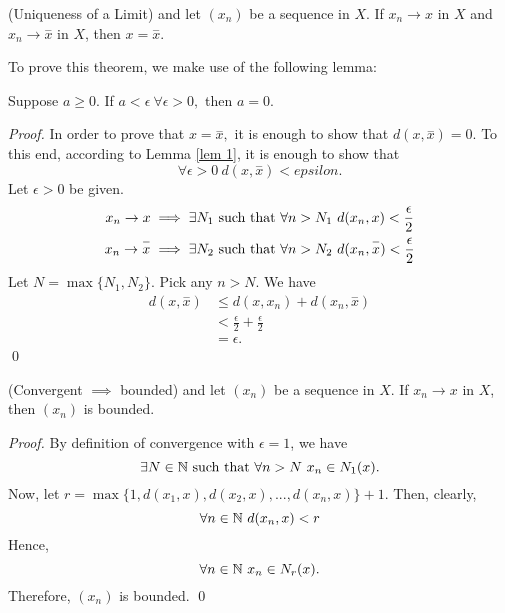 \documentclass[a4paper]{article}
\begin{document}
    \begin{theorem}(Uniqueness of a Limit)
        \routineMS and let $(x_n)$ be a sequence in $X$. If $x_n \to x$ in $X$ and $x_n \to \overset{-}{x}$ in $X$, then $x = \overset{-}{x}$.
    \end{theorem}
     To prove this theorem, we make use of the following lemma:
     \begin{lemma}
        \label{lem 1}
        Suppose $a \geq 0.$ If $a < \epsilon ~\forall \epsilon > 0,$ then $a=0$.
     \end{lemma}
     \begin{proof}
        In order to prove that $x = \overset{-}{x},$ it is enough to show that $d(x, \overset{-}{x}) = 0.$ To this end, according to Lemma \ref{lem 1}, it is enough to show that
        $$\forall \epsilon > 0 ~ d(x, \overset{-}{x}) < epsilon.$$
        Let $\epsilon > 0$ be given.
        \begin{align*}
            x_n \to x &\implies \exists N_1 \text{ such that } \forall n > N_1 ~d(x_n, x) < \frac{\epsilon}{2} \\
            x_n \to \overset{-}{x} &\implies \exists N_2 \text{ such that } \forall n > N_2 ~d(x_n, \overset{-}{x}) < \frac{\epsilon}{2}
        \end{align*}
        Let $N= \max\{N_1, N_2\}$. Pick any $n > N$. We have
        \begin{align*}
            d(x, \overset{-}{x}) &\leq d(x, x_n) + d(x_n, \overset{-}{x}) \\
            &< \frac{\epsilon}{2} + \frac{\epsilon}{2} \\
            &= \epsilon.
        \end{align*}
        \qed
     \end{proof}

     \begin{theorem}(Convergent $\implies$ bounded)
        \routineMS and let $(x_n)$ be a sequence in $X$. If $x_n \to x$ in $X$, then $(x_n)$ is bounded.
     \end{theorem}
     \begin{proof}
        By definition of convergence with $\epsilon = 1$, we have
        $$\exists N \in \mathbb{N} \text{ such that } \forall n > N ~x_n \in N_1(x).$$
        Now, let $r= \max \{1, d(x_1, x), d(x_2, x), ..., d(x_n, x)\} + 1$.
        Then, clearly,
        $$\forall n \in \mathbb{N} ~d(x_n, x) < r$$
        Hence,
        $$ \forall n \in \mathbb{N} ~x_n \in N_r(x).$$
        Therefore, $(x_n)$ is bounded. \qed
     \end{proof}
\end{document}
